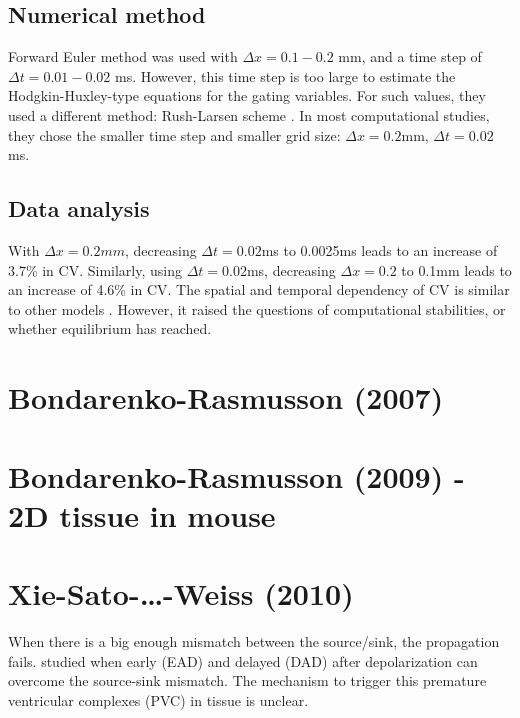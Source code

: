 \subsection{Numerical method}

Forward Euler method was used with $\Delta x=0.1-0.2$ mm, and a time step of
$\Delta t = 0.01-0.02$ ms. However, this time step is too large to estimate the
Hodgkin-Huxley-type equations for the gating variables. For such values, they
used a different method: Rush-Larsen scheme \citep{rush1978pas}. In most
computational studies, they chose the smaller time step and smaller grid
size: $\Delta x=0.2$mm, $\Delta t=0.02$ms.


\subsection{Data analysis}

With $\Delta x=0.2mm$, decreasing $\Delta t=0.02$ms to 0.0025ms leads to an
increase of 3.7\% in CV. Similarly, using $\Delta t=0.02$ms, decreasing $\Delta
x=0.2$ to 0.1mm leads to an increase of 4.6\% in CV. The spatial and temporal
dependency of CV is similar to other models \citep{52}. However, it raised the
questions of computational stabilities, or whether equilibrium has reached. 


\section{Bondarenko-Rasmusson (2007)}

\citep{bondarenko2007}

\section{Bondarenko-Rasmusson (2009) - 2D tissue in mouse}

\citep{bondarenko2009}

\section{Xie-Sato-\ldots-Weiss (2010)}
\label{sec:xie-weiss2010}

When there is a big enough mismatch between the source/sink, the propagation
fails. \citep{xie2010sls} studied when early (EAD) and delayed (DAD) after
depolarization can overcome the source-sink mismatch. The mechanism to trigger
this premature ventricular complexes (PVC) in tissue is unclear.

